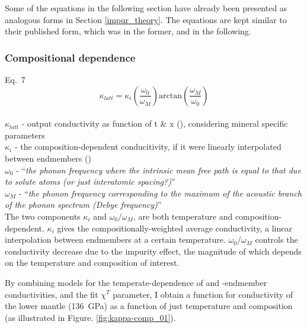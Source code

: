 Some of the equations in the following section have already been presented as analogous forms in Section \ref{impur_theory}. The equations are kept similar to their published form, which was \citet{Stackhouse2015} in the former, and \citet{Ohta2017, Okuda2017} in the following.

\pagebreak
    
\subsubsection{Compositional dependence}

\citet{Ohta2017} Eq.~7
\begin{equation}%
\kappa_{latt}=\kappa_{i}\left ( \frac{\omega_{0}}{\omega_{M}} \right )\mathrm{arctan}\left ( \frac{\omega_{M}}{\omega_{0}} \right )
\label{eq.ohta7}
\end{equation}%
\\ $\kappa_{latt}$ - output conductivity as function of t \& x (\wmk), considering mineral specific parameters\\
$\kappa_{i}$ - the composition-dependent conducitivity, if it were linearly interpolated between endmembers (\wmk)\\
$\omega_{0}$ - \enquote{\textit{the phonon frequency where the intrinsic mean free path is equal to that due to solute atoms (or just interatomic spacing?)}}\\
$\omega_{M}$ - \enquote{\textit{the phonon frequency corresponding to the maximum of the acoustic branch of the phonon spectrum (Debye frequency)}}\\

The two components $\kappa_{i}$ and $\omega_{0}/\omega_{M}$, are both temperature and composition-dependent. $\kappa_{i}$ gives the compositionally-weighted average conductivity, a linear interpolation between endmembers at a certain temperature. $\omega_{0}/\omega_{M}$ controls the conductivity decrease due to the impurity effect, the magnitude of which depends on the temperature and composition of interest.

By combining models for the temperate-dependence of \mgsios and \fesio-endmember conductivities, and the fit $\chi^{T}$ parameter, I obtain a function for conductivity of the lower mantle (136~GPa) as a function of just temperature and composition (as illustrated in Figure. \ref{fig:kappa-comp_01}).\\




